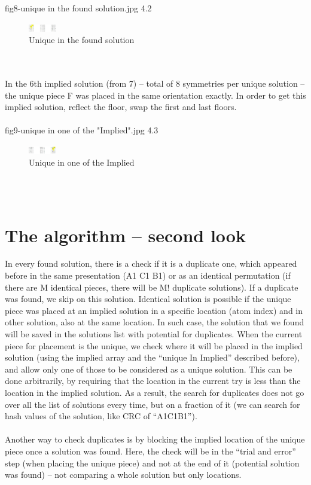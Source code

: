 \documentclass[a4paper,twoside,10pt]{report}
\begin{document}
fig8-unique in the found solution.jpg 4.2
\\
\begin{figure}[p]
	\includegraphics[width=12mm]{fig8-unique_in_the_found_solution.jpg}
	\caption{Unique in the found solution}
	\label{fig:Unique in the found solution}
\end{figure}
\\
\\In the 6th implied solution (from 7) – total of 8 symmetries per unique solution – the unique piece F was placed in the same orientation exactly. In order to get this implied solution, reflect the floor, swap the first and last floors.
\\\\
fig9-unique in one of the "Implied".jpg 4.3
\\
\begin{figure}[p]
	\includegraphics[width=12mm]{fig9-unique_in_one_of_the_Implied.jpg}
	\caption{Unique in one of the Implied}
	\label{fig:Unique in one of the Implied}
\end{figure}
\\\

\chapter{The algorithm – second look}\label{The algorithm – second look}

In every found solution, there is a check if it is a duplicate one, which appeared before in the same presentation (A1 C1 B1) or as an identical permutation (if there are M identical pieces, there will be M! duplicate solutions). If a duplicate was found, we skip on this solution. Identical solution is possible if the unique piece was placed at an implied solution in a specific location (atom index) and in other solution, also at the same location. In such case, the solution that we found will be saved in the solutions list with potential for duplicates. When the current piece for placement is the unique, we check where it will be placed in the implied solution (using the implied array and the “unique In Implied” described before), and allow only one of those to be considered as a unique solution. This can be done arbitrarily, by requiring that the location in the current try is less than the location in the implied solution. As a result, the search for duplicates does not go over all the list of solutions every time, but on a fraction of it (we can search for hash values of the solution, like CRC of “A1C1B1”).
\\
\\
Another way to check duplicates is by blocking the implied location of the unique piece once a solution was found. Here, the check will be in the “trial and error” step (when placing the unique piece) and not at the end of it (potential solution was found) – not comparing a whole solution but only locations.
\end{document}
